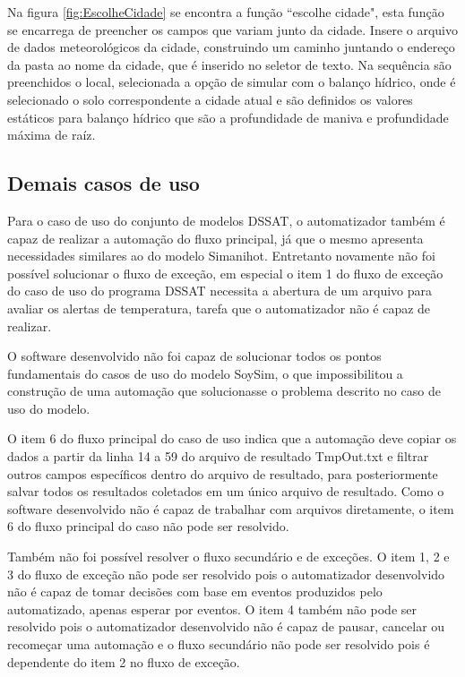 \documentclass[tg]{mdtufsm}
\begin{document}
                    Na figura \ref{fig:EscolheCidade} se encontra a função ``escolhe cidade", esta função se encarrega de preencher os campos que variam junto da cidade. Insere o arquivo de dados meteorológicos da cidade, construindo um caminho juntando o endereço da pasta ao nome da cidade, que é inserido no seletor de texto. Na sequência são preenchidos o local, selecionada a opção de simular com o balanço hídrico, onde é selecionado o solo correspondente a cidade atual e são definidos os valores estáticos para balanço hídrico que são a profundidade de maniva e profundidade máxima de raíz.

                \subsection{Demais casos de uso}

                    Para o caso de uso do conjunto de modelos DSSAT, o automatizador também é capaz de realizar a automação do fluxo principal, já que o mesmo apresenta necessidades similares ao do modelo Simanihot. Entretanto novamente não foi possível solucionar o fluxo de exceção, em especial o item 1 do fluxo de exceção do caso de uso do programa DSSAT necessita a abertura de um arquivo para avaliar os alertas de temperatura, tarefa que o automatizador não é capaz de realizar.

                    O software desenvolvido não foi capaz de solucionar todos os pontos fundamentais do casos de uso do modelo SoySim, o que impossibilitou a construção de uma automação que solucionasse o problema descrito no caso de uso do modelo.

                    O item 6 do fluxo principal do caso de uso indica que a automação deve copiar os dados a partir da linha 14 a 59 do arquivo de resultado TmpOut.txt e filtrar outros campos específicos dentro do arquivo de resultado, para posteriormente salvar todos os resultados coletados em um único arquivo de resultado. Como o software desenvolvido não é capaz de trabalhar com arquivos diretamente, o item 6 do fluxo principal do caso não pode ser resolvido.

                    Também não foi possível resolver o fluxo secundário e de exceções. O item 1, 2 e 3 do fluxo de exceção não pode ser resolvido pois o automatizador desenvolvido não é capaz de tomar decisões com base em eventos produzidos pelo automatizado, apenas esperar por eventos. O item 4 também não pode ser resolvido pois o automatizador desenvolvido não é capaz de pausar, cancelar ou recomeçar uma automação e o fluxo secundário não pode ser resolvido pois é dependente do item 2 no fluxo de exceção.
\end{document}
